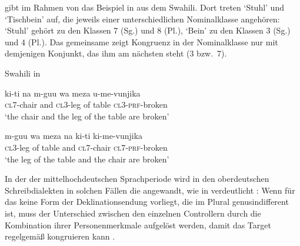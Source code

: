 \citet[169]{corbett2006} gibt im Rahmen von  das Beispiel
in  aus dem Swahili. Dort treten  `Stuhl' und
 `Tischbein' auf, die jeweils einer unterschiedlichen
Nominalklasse angehören:  `Stuhl' gehört zu den Klassen 7 (Sg.) und 8
(Pl.),  `Bein' zu den Klassen 3 (Sg.) und 4 (Pl.). Das gemeinsame
  zeigt Kongruenz in der Nominalklasse nur mit
demjenigen Konjunkt, das ihm am nächsten steht (3 bzw.~7).

\begin{exe}
\ex \label{ex:cca}
	\langinfo%
		{Swahili}%
		{}%
		{\cite[45]{bokamba1985} in \cite[169]{corbett2006}}
	\begin{xlist}
	\ex \label{ex:cca_1}
		\gll ki-ti na m-guu wa meza u-me-vunjika \\
			\textsc{cl7}-chair and \textsc{cl3}-leg of table
			\textsc{cl3}-\textsc{prf}-broken \\
		\trans `the chair and the leg of the table are broken'

	\ex \label{ex:cca_2}
		\gll m-guu wa meza na ki-ti ki-me-vunjika \\
			\textsc{cl3}-leg of table and \textsc{cl7}-chair
			\textsc{cl7}-\textsc{prf}-broken \\
		\trans `the leg of the table and the chair are broken'
	\end{xlist}
\end{exe}

In der  der mittelhochdeutschen
Sprachperiode wird in den oberdeutschen
Schreibdialekten in solchen Fällen die
 angewandt, wie in 
verdeutlicht
\autocites[vgl.][312]{grimm1890}[329]{grimm1898}[39--41]{behaghel1928}[187--189]{dal2014}:
Wenn für das  keine Form der Deklinationsendung vorliegt, die im
Plural genusindifferent ist, muss der Unterschied zwischen
den einzelnen Controllern durch die Kombination ihrer
Personenmerkmale aufgelöst werden, damit das Target
regelgemäß kongruieren kann
\autocites[vgl.][182--193]{corbett1983}[269--306]{corbett1991}[243--263]{corbett2006}.

